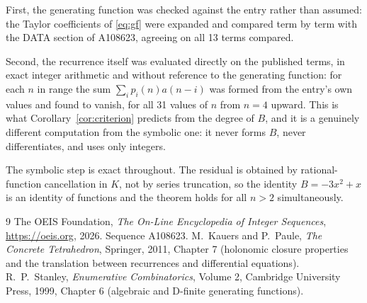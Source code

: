 \documentclass[11pt,a4paper]{article}
\theoremstyle{plain}
\theoremstyle{definition}
\begin{document}
First, the generating function was checked against the entry rather than assumed: the
Taylor coefficients of \eqref{eq:gf} were expanded and compared term by term with the DATA
section of A108623, agreeing on all 13 terms compared.

Second, the recurrence itself was evaluated directly on the published terms, in exact
integer arithmetic and without reference to the generating function: for each $n$ in range
the sum $\sum_{i}p_{i}(n)a(n-i)$ was formed from the entry's own values and found to
vanish, for all 31 values of $n$ from $n=4$ upward. This is what
Corollary~\ref{cor:criterion} predicts from the degree of $B$, and it is a genuinely
different computation from the symbolic one: it never forms $B$, never differentiates, and
uses only integers.

The symbolic step is exact throughout. The residual is obtained by rational-function
cancellation in $K$, not by series truncation, so the identity $B=- 3 x^{2} + x$ is an
identity of functions and the theorem holds for all $n>2$ simultaneously.

\begin{thebibliography}{9}
 The OEIS Foundation, \emph{The On-Line Encyclopedia of Integer Sequences},
\url{https://oeis.org}, 2026. Sequence A108623.
 M.~Kauers and P.~Paule, \emph{The Concrete Tetrahedron}, Springer, 2011,
Chapter 7 (holonomic closure properties and the translation between recurrences and
differential equations).
 R.~P.~Stanley, \emph{Enumerative Combinatorics}, Volume 2, Cambridge
University Press, 1999, Chapter 6 (algebraic and D-finite generating functions).
\end{thebibliography}
\end{document}
